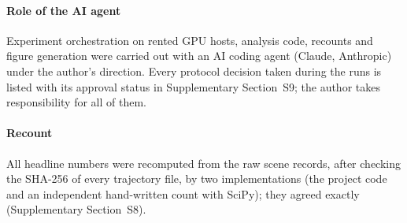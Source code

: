 \paragraph{Role of the AI agent} Experiment orchestration on rented GPU hosts, analysis code, recounts and figure generation were carried out with an AI coding agent (Claude, Anthropic) under the author's direction. Every protocol decision taken during the runs is listed with its approval status in Supplementary Section~S9; the author takes responsibility for all of them.

\paragraph{Recount} All headline numbers were recomputed from the raw scene records, after checking the SHA-256 of every trajectory file, by two implementations (the project code and an independent hand-written count with SciPy); they agreed exactly (Supplementary Section~S8).

